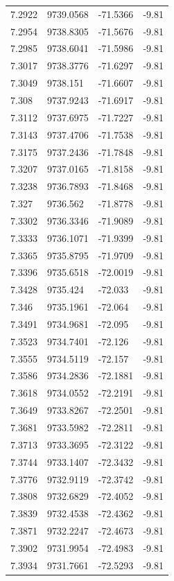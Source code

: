 \begin{table}[H]
\begin{tabular}{llll}
7.2922 & 9739.0568 & -71.5366 & -9.81 \\
7.2954 & 9738.8305 & -71.5676 & -9.81 \\
7.2985 & 9738.6041 & -71.5986 & -9.81 \\
7.3017 & 9738.3776 & -71.6297 & -9.81 \\
7.3049 & 9738.151 & -71.6607 & -9.81 \\
7.308 & 9737.9243 & -71.6917 & -9.81 \\
7.3112 & 9737.6975 & -71.7227 & -9.81 \\
7.3143 & 9737.4706 & -71.7538 & -9.81 \\
7.3175 & 9737.2436 & -71.7848 & -9.81 \\
7.3207 & 9737.0165 & -71.8158 & -9.81 \\
7.3238 & 9736.7893 & -71.8468 & -9.81 \\
7.327 & 9736.562 & -71.8778 & -9.81 \\
7.3302 & 9736.3346 & -71.9089 & -9.81 \\
7.3333 & 9736.1071 & -71.9399 & -9.81 \\
7.3365 & 9735.8795 & -71.9709 & -9.81 \\
7.3396 & 9735.6518 & -72.0019 & -9.81 \\
7.3428 & 9735.424 & -72.033 & -9.81 \\
7.346 & 9735.1961 & -72.064 & -9.81 \\
7.3491 & 9734.9681 & -72.095 & -9.81 \\
7.3523 & 9734.7401 & -72.126 & -9.81 \\
7.3555 & 9734.5119 & -72.157 & -9.81 \\
7.3586 & 9734.2836 & -72.1881 & -9.81 \\
7.3618 & 9734.0552 & -72.2191 & -9.81 \\
7.3649 & 9733.8267 & -72.2501 & -9.81 \\
7.3681 & 9733.5982 & -72.2811 & -9.81 \\
7.3713 & 9733.3695 & -72.3122 & -9.81 \\
7.3744 & 9733.1407 & -72.3432 & -9.81 \\
7.3776 & 9732.9119 & -72.3742 & -9.81 \\
7.3808 & 9732.6829 & -72.4052 & -9.81 \\
7.3839 & 9732.4538 & -72.4362 & -9.81 \\
7.3871 & 9732.2247 & -72.4673 & -9.81 \\
7.3902 & 9731.9954 & -72.4983 & -9.81 \\
7.3934 & 9731.7661 & -72.5293 & -9.81 \\

\end{tabular}
\end{table}
